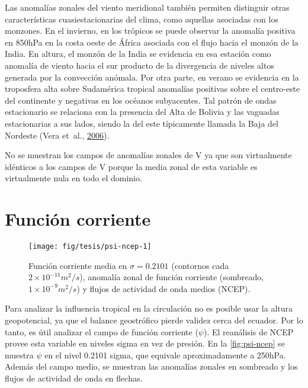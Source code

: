 \documentclass[spanish,a4paper,12pt]{book}
\begin{document}
Las anomalías zonales del viento meridional también permiten distinguir
otras características cuasiestacionarias del clima, como aquellas
asociadas con los monzones. En el invierno, en los trópicos se puede
observar la anomalía positiva en 850hPa en la costa oeste de África
asociada con el flujo hacia el monzón de la India. En altura, el monzón
de la India se evidencia en esa estación como anomalía de viento hacia
el sur producto de la divergencia de niveles altos generada por la
convección anómala. Por otra parte, en verano se evidencia en la
troposfera alta sobre Sudamérica tropical anomalías positivas sobre el
centro-este del continente y negativas en los océanos subyacentes. Tal
patrón de ondas estacionario se relaciona con la presencia del Alta de
Bolivia y las vaguadas estacionarias a sus lados, siendo la del este
típicamente llamada la Baja del Nordeste (Vera et~al.,
\protect\hyperlink{ref-Vera2006}{2006}).

No se muestran los campos de anomalías zonales de V ya que son
virtualmente idénticos a los campos de V porque la media zonal de esta
variable es virtualmente nula en todo el dominio.

\begin{landscape}\end{landscape}

\section{Función corriente}\label{funcion-corriente}

\begin{landscape}\begin{figure}

{\centering \texttt{[image: fig/tesis/psi-ncep-1]} 

}

\caption{Función corriente media en $\sigma = 0.2101$ (contornos cada $2\times10^{-11}m^2/s$), anomalía zonal de función corriente (sombreado,  $1\times10^{-9}m^2/s$) y flujos de actividad de onda medios (NCEP).}\label{fig:psi-ncep}
\end{figure}
\end{landscape}

Para analizar la influencia tropical en la circulación no es posible
usar la altura geopotencial, ya que el balance geostrófico pierde
validez cerca del ecuador. Por lo tanto, es útil analizar el campo de
función corriente (\(\psi\)). El reanálisis de NCEP provee esta variable
en niveles sigma en vez de presión. En la \autoref{fig:psi-ncep} se
muestra \(\psi\) en el nivel 0.2101 sigma, que equivale aproximadamente
a 250hPa. Además del campo medio, se muestran las anomalías zonales en
sombreado y los flujos de actividad de onda en flechas.
\end{document}
